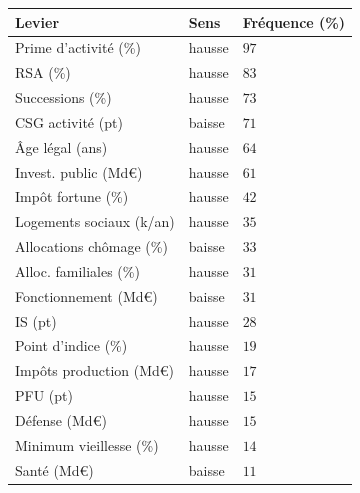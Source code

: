 \begin{tabular}{lll}\toprule Levier & Sens & Fréquence (\%)\\ \midrule
Prime d'activité (\%) & hausse & $97$\\
RSA (\%) & hausse & $83$\\
Successions (\%) & hausse & $73$\\
CSG activité (pt) & baisse & $71$\\
Âge légal (ans) & hausse & $64$\\
Invest. public (Md€) & hausse & $61$\\
Impôt fortune (\%) & hausse & $42$\\
Logements sociaux (k/an) & hausse & $35$\\
Allocations chômage (\%) & baisse & $33$\\
Alloc. familiales (\%) & hausse & $31$\\
Fonctionnement (Md€) & baisse & $31$\\
IS (pt) & hausse & $28$\\
Point d'indice (\%) & hausse & $19$\\
Impôts production (Md€) & hausse & $17$\\
PFU (pt) & hausse & $15$\\
Défense (Md€) & hausse & $15$\\
Minimum vieillesse (\%) & hausse & $14$\\
Santé (Md€) & baisse & $11$\\\bottomrule\end{tabular}